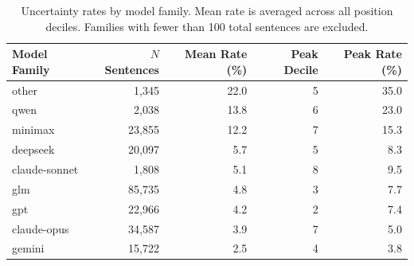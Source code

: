 \begin{table}[t]
\centering
\caption{Uncertainty rates by model family. Mean rate is averaged across all position deciles. Families with fewer than 100 total sentences are excluded.}
\label{tab:families}
\small
\begin{tabular}{lrrrr}
\toprule
Model Family & $N$ Sentences & Mean Rate (\%) & Peak Decile & Peak Rate (\%) \\
\midrule
other & 1{,}345 & 22.0 & 5 & 35.0 \\
qwen & 2{,}038 & 13.8 & 6 & 23.0 \\
minimax & 23{,}855 & 12.2 & 7 & 15.3 \\
deepseek & 20{,}097 & 5.7 & 5 & 8.3 \\
claude-sonnet & 1{,}808 & 5.1 & 8 & 9.5 \\
glm & 85{,}735 & 4.8 & 3 & 7.7 \\
gpt & 22{,}966 & 4.2 & 2 & 7.4 \\
claude-opus & 34{,}587 & 3.9 & 7 & 5.0 \\
gemini & 15{,}722 & 2.5 & 4 & 3.8 \\
\bottomrule
\end{tabular}
\end{table}
